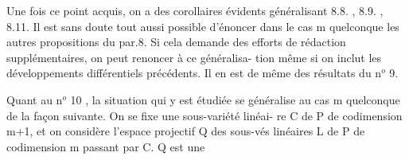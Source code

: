 Une fois ce point acquis,  on a des corollaires évidents généralisant
8.8. , 8.9. , 8.11.   Il est sans doute tout aussi possible d'énoncer dans
le cas m quelconque  les autres propositions du par.8. Si cela demande des
efforts de rédaction  supplémentaires, on peut renoncer à ce généralisa-%
tion\hand{,}  même si on inclut les développements différentiels précédents.
Il en est de même des résultats du n$^o$ 9.

Quant au n$^o$ 10 ,  la situation qui y est étudiée se généralise au
cas m quelconque de la façon suivante. On se fixe une sous-variété linéai-
re C de P  de codimension m+1, et on considère l'espace projectif Q des
sous-vés linéaires L de P de codimension m passant par C. Q est une

